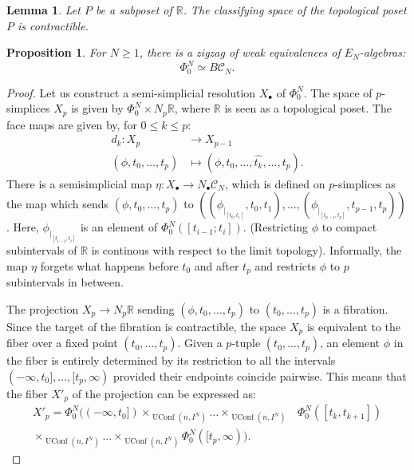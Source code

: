 \documentclass[10pt,a4paper]{amsart}
\newtheorem{lem}{Lemma}
\newtheorem{prop}{Proposition}
\newcommand{\C}{\mathcal{C}}
\DeclareMathOperator{\UConf}{UConf}
\begin{document}
\begin{lem}\label{posetthing}
    Let $P$ be a subposet of $\mathbb{R}$.
    The classifying space of the topological poset $P$ is contractible.
\end{lem}

\begin{prop}\label{deloopinglevelone}
For $N\geq 1$, there is a zigzag of weak equivalences of $E_N$-algebras:
\[\Phi_0^N \simeq B\C_N.\]
\end{prop}

\begin{proof}
Let us construct a semi-simplicial resolution $X_\bullet$ of $\Phi_0^N.$
The space of $p$-simplices $X_p$ is given by $\Phi_0^N\times N_p\mathbb{R}$, where $\mathbb{R}$ is seen as a topological poset.
The face maps are given by, for $0\leq k \leq p$:
\begin{align*}
    d_k: X_p&\rightarrow X_{p-1}\\
    (\phi,t_0,\dots, t_p) &\mapsto (\phi,t_0,\dots, \hat{t_k},\dots, t_p).
\end{align*}
There is a semisimplicial map $\eta: X_\bullet\rightarrow N_\bullet\C_N$, which is defined on $p$-simplices as the map which sends $(\phi,t_0,\dots, t_p)$ to $\left((\phi_{\vert_{[t_0,t_1]}},t_0,t_1),\dots,(\phi_{\vert_{[t_{p-1},t_p]}},t_{p-1},t_p)\right)$. 
Here, $\phi_{\vert_{[t_{i-1},t_i]}}$ is an element of $\Phi_0^N([t_{i-1};t_i])$.
(Restricting $\phi$ to compact subintervals of $\mathbb{R}$ is continous with respect to the limit topology).
Informally, the map $\eta$ forgets what happens before $t_0$ and after $t_p$ and restricts $\phi$ to $p$ subintervals in between.

The projection $X_p\rightarrow N_p\mathbb{R}$ sending $(\phi, t_0,\dots, t_p)$ to $(t_0,\dots, t_p)$ is a fibration. 
Since the target of the fibration is contractible, the space $X_p$ is equivalent to the fiber over a fixed point $(t_0,\dots, t_p)$.
Given a $p$-tuple $(t_0,\dots,t_p)$, an element $\phi$ in the fiber is entirely determined by its restriction to all the intervals $(-\infty,t_0],\dots,[t_p,\infty)$ provided their endpoints coincide pairwise.
This means that the fiber $X'_p$ of the projection can be expressed as:
\begin{align}
X'_p =\Phi_0^N((-\infty,t_0])\times_{\UConf(n,I^N)}\dots\times_{\UConf(n,I^N)}&\Phi_0^N([t_k,t_{k+1}]) \label{fiberprime}\\
\times_{\UConf(n,I^N)}\dots\times_{\UConf(n,I^N)}\Phi_0^N([t_p,\infty)) \nonumber.
\end{align}


\end{proof}
\end{document}
